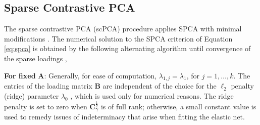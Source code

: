 \subsection{Sparse Contrastive PCA}

The sparse contrastive PCA (scPCA) procedure applies SPCA with minimal
modifications . The numerical solution to the SPCA 
criterion of Equation \eqref{eq:spca} is obtained by the following
alternating algorithm until convergence of the sparse loadings \citep{Zou2006},

\textbf{For fixed} $\mathbf{A}$:
Generally, for ease of computation, $\lambda_{1, j} = \lambda_1$, for
$j=1, \ldots, k$. The entries of the loading matrix $\mathbf{B}$ are independent of
the choice for the $\ell_2$ penalty (ridge) parameter $\lambda_0$
\citep{Zou2006}, which is used only for numerical reasons. The ridge penalty is set to zero when
$\mathbf{C}^{\frac{1}{2}}_\gamma$ is of full rank; otherwise, a small constant
value is used to remedy issues of indeterminacy that arise when fitting the
elastic net.

